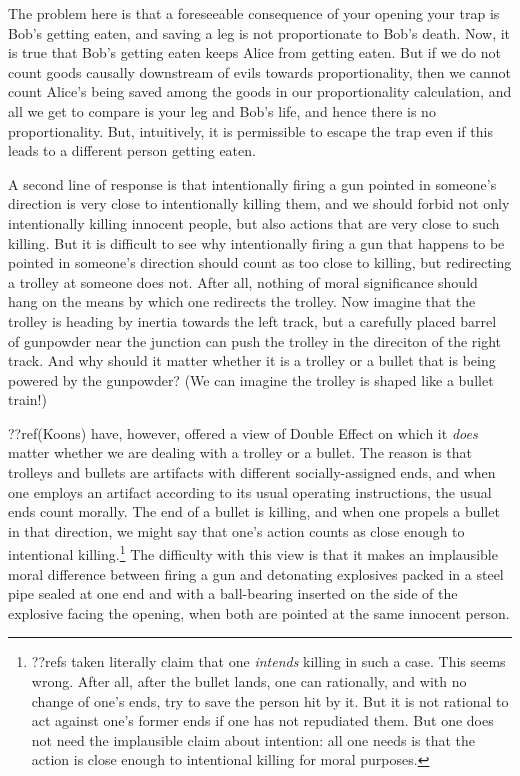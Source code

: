 The problem here is that a foreseeable consequence of your opening your trap is Bob's getting eaten, and saving a leg is not
proportionate to Bob's death. Now, it is true that Bob's getting eaten keeps Alice from getting eaten. But if we do not count
goods causally downstream of evils towards proportionality, then we cannot count Alice's being saved among the goods in 
our proportionality calculation, and all we get to compare is your leg and Bob's life, and hence there is no proportionality.
But, intuitively, it is permissible to escape the trap even if this leads to a different person getting eaten.

A second line of response is that intentionally firing a gun pointed in someone's direction is very close to intentionally
killing them, and we should forbid not only intentionally killing innocent people, but also actions that are very close to such
killing. But it is difficult to see why intentionally firing a gun that happens to be pointed in someone's direction should 
count as too close to killing, but redirecting a trolley at someone does not. After all, nothing of moral significance should
hang on the means by which one redirects the trolley. Now imagine that the trolley is heading by inertia towards the left 
track, but a carefully placed barrel of gunpowder near the junction can push the trolley in the direciton of the right track.
And why should it matter whether it is a trolley or a bullet that is being powered by the gunpowder? (We can imagine the
trolley is shaped like a bullet train!) 

??ref(Koons) have, however, offered a view of Double Effect on which it \textit{does} matter whether we are dealing with 
a trolley or a bullet. The reason is that trolleys and bullets are artifacts with different socially-assigned ends, and when 
one employs an artifact according to its usual operating instructions, the usual ends count morally. The end of a bullet is
killing, and when one propels a bullet in that direction, we might say that one's action counts as close enough to intentional 
killing.\footnote{??refs taken literally claim that one \textit{intends} killing in such a case. This seems wrong. After all,
after the bullet lands, one can rationally, and with no change of one's ends, try to save the person hit by it. 
But it is not rational to act against one's former ends if one has not repudiated them. But one does not need the implausible
claim about intention: all one needs is that the action is close enough to intentional killing for moral purposes.} The
difficulty with this view is that it makes an implausible moral difference between firing a gun and detonating explosives 
packed in a steel pipe sealed at one end and with a ball-bearing inserted on the side of the explosive facing the opening,
when both are pointed at the same innocent person. 

